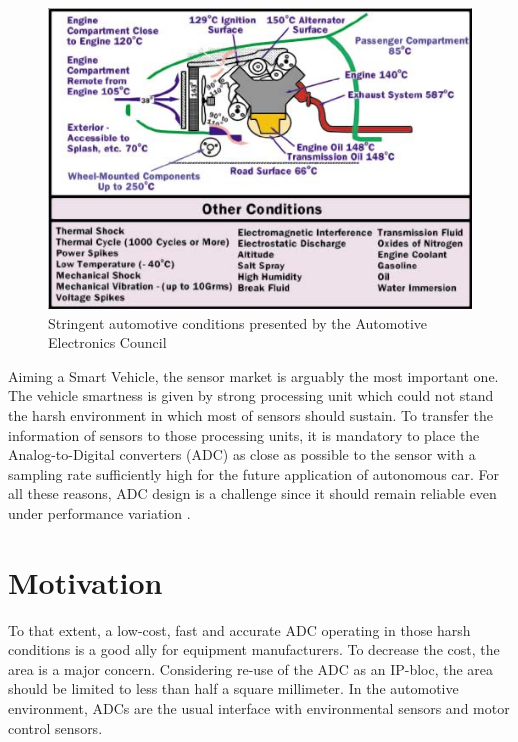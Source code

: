 \begin{figure}[htp]
	\centering
	\includegraphics[width=.8\textwidth]{Chapter1/Figs/automotive_cond.png}
	\caption{Stringent automotive conditions presented by the Automotive Electronics Council~\cite{1393072,ISO16750}}
	\label{fig:automotive-cond}
\end{figure}

Aiming a Smart Vehicle, the sensor market is arguably the most important one. The vehicle smartness is given by strong processing unit which could not stand the harsh environment in which most of sensors should sustain. To transfer the information of sensors to those processing units, it is mandatory to place the Analog-to-Digital converters (ADC) as close as possible to the sensor with a sampling rate sufficiently high for the future application of autonomous car. For all these reasons, ADC design is a challenge since it should remain reliable even under performance variation \cite{Cai2012}.

\section{Motivation}   %
To that extent, a low-cost, fast and accurate ADC operating in those harsh conditions is a good ally for equipment manufacturers. To decrease the cost, the area is a major concern. Considering re-use of the ADC as an IP-bloc, the area should be limited to less than half a square millimeter.
In the automotive environment, ADCs are the usual interface with environmental sensors and motor control sensors. 

